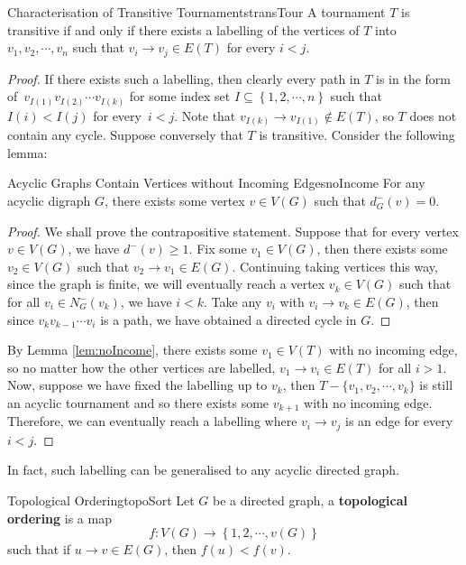 \documentclass[math]{amznotes}
\theoremstyle{remark}
\newcommand{\0}{\mathbf{0}}
\newcommand{\1}{\mathbf{1}}
\begin{document}
\begin{probox}{Characterisation of Transitive Tournaments}{transTour}
    A tournament $T$ is transitive if and only if there exists a labelling of the vertices of $T$ into~$v_1, v_2, \cdots, v_n$ such that $v_i \to v_j \in E(T)$ for every $i < j$.
    \tcblower
    \begin{proof}
        If there exists such a labelling, then clearly every path in $T$ is in the form of~$v_{I(1)}v_{I(2)}\cdots v_{I(k)}$ for some index set $I \subseteq \left\{1, 2, \cdots, n\right\}$ such that $I(i) < I(j)$ for every~$i < j$. Note that $v_{I(k)} \to v_{I(1)} \notin E(T)$, so $T$ does not contain any cycle. Suppose conversely that $T$ is transitive. Consider the following lemma:
        \begin{lembox}{Acyclic Graphs Contain Vertices without Incoming Edges}{noIncome}
            For any acyclic digraph $G$, there exists some vertex $v \in V(G)$ such that $d^-_G(v) = 0$.
            \tcblower
            \begin{proof}
                We shall prove the contrapositive statement. Suppose that for every vertex $v \in V(G)$, we have $d^-(v) \geq 1$. Fix some $v_1 \in V(G)$, then there exists some~$v_2 \in V(G)$ such that $v_2 \to v_1 \in E(G)$. Continuing taking vertices this way, since the graph is finite, we will eventually reach a vertex $v_k \in V(G)$ such that for all $v_i \in N_G^-(v_k)$, we have $i < k$. Take any $v_i$ with $v_i \to v_k \in E(G)$, then since $v_kv_{k - 1}\cdots v_i$ is a path, we have obtained a directed cycle in $G$.
            \end{proof}
        \end{lembox}
        By Lemma \ref{lem:noIncome}, there exists some $v_1 \in V(T)$ with no incoming edge, so no matter how the other vertices are labelled, $v_1 \to v_i \in E(T)$ for all $i > 1$. Now, suppose we have fixed the labelling up to $v_k$, then $T - \{v_1, v_2, \cdots, v_k\}$ is still an acyclic tournament and so there exists some $v_{k + 1}$ with no incoming edge. Therefore, we can eventually reach a labelling where $v_i \to v_j$ is an edge for every $i < j$.
    \end{proof}
\end{probox}
In fact, such labelling can be generalised to any acyclic directed graph.
\begin{dfnbox}{Topological Ordering}{topoSort}
    Let $G$ be a directed graph, a {\color{red} \textbf{topological ordering}} is a map 
    \begin{equation*}
        f \colon V(G) \to \left\{1, 2, \cdots, v(G)\right\}
    \end{equation*}
    such that if $u \to v \in E(G)$, then $f(u) < f(v)$.
\end{dfnbox}
\end{document}
